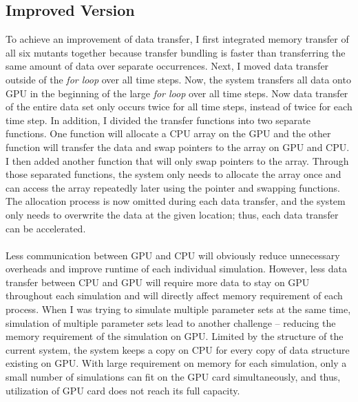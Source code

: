 \documentclass[../thesis.tex]{subfiles}
\begin{document}
\subsection{Improved Version}
To achieve an improvement of data transfer, I first integrated memory transfer of all six mutants together because transfer bundling is faster than transferring the same amount of data over separate occurrences. Next, I moved data transfer outside of the \textit{for loop} over all time steps. Now, the system transfers all data onto GPU in the beginning of the large \textit{for loop} over all time steps. Now data transfer of the entire data set only occurs twice for all time steps, instead of twice for each time step. In addition, I divided the transfer functions into two separate functions. One function will allocate a CPU array on the GPU and the other function will transfer the data and swap pointers to the array on GPU and CPU. I then added another function that will only swap pointers to the array. Through those separated functions, the system only needs to allocate the array once and can access the array repeatedly later using the pointer and swapping functions. The allocation process is now omitted during each data transfer, and the system only needs to overwrite the data at the given location; thus, each data transfer can be accelerated.\\
\\
	Less communication between GPU and CPU will obviously reduce unnecessary overheads and improve runtime of each individual simulation. However, less data transfer between CPU and GPU will require more data to stay on GPU throughout each simulation and will directly affect memory requirement of each process. When I was trying to simulate multiple parameter sets at the same time, simulation of multiple parameter sets lead to another challenge -- reducing the memory requirement of the simulation on GPU. Limited by the structure of the current system, the system keeps a copy on CPU for every copy of data structure existing on GPU. With large requirement on memory for each simulation, only a small number of simulations can fit on the GPU card simultaneously, and thus, utilization of GPU card does not reach its full capacity. \\
	\\
\end{document}
